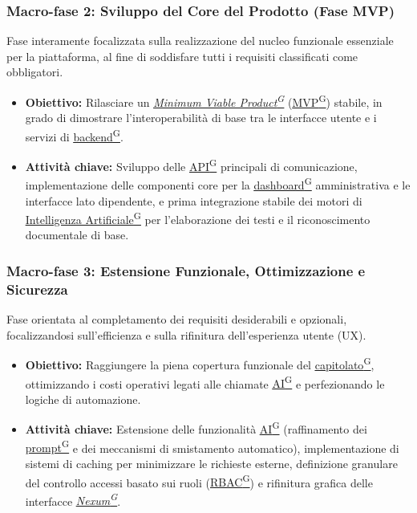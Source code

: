 \documentclass[a4paper,12pt]{article}
\providecommand{\glslink}[2]{\href{https://alittlebyte-19.github.io/Documentazione/glossario.html\#gls-#1}{\underline{#2}\textsuperscript{\scriptsize G}}}
\begin{document}
\subsubsection{Macro-fase 2: Sviluppo del Core del Prodotto (Fase MVP)}
Fase interamente focalizzata sulla realizzazione del nucleo funzionale essenziale per la piattaforma, al fine di soddisfare tutti i requisiti classificati come obbligatori.
\begin{itemize}
    \item \textbf{Obiettivo:} Rilasciare un \textit{\glslink{mvp-minimum-viable-product}{Minimum Viable Product}} (\glslink{mvp-minimum-viable-product}{MVP}) stabile, in grado di dimostrare l'interoperabilità di base tra le interfacce utente e i servizi di \glslink{backend}{backend}.
    \item \textbf{Attività chiave:} Sviluppo delle \glslink{api-application-programming-interface}{API} principali di comunicazione, implementazione delle componenti core per la \glslink{dashboard}{dashboard} amministrativa e le interfacce lato dipendente, e prima integrazione stabile dei motori di \glslink{intelligenza-artificiale-ai}{Intelligenza Artificiale} per l'elaborazione dei testi e il riconoscimento documentale di base.
\end{itemize}

\subsubsection{Macro-fase 3: Estensione Funzionale, Ottimizzazione e Sicurezza}
Fase orientata al completamento dei requisiti desiderabili e opzionali, focalizzandosi sull'efficienza e sulla rifinitura dell'esperienza utente (UX).
\begin{itemize}
    \item \textbf{Obiettivo:} Raggiungere la piena copertura funzionale del \glslink{capitolato}{capitolato}, ottimizzando i costi operativi legati alle chiamate \glslink{intelligenza-artificiale-ai}{AI} e perfezionando le logiche di automazione.
    \item \textbf{Attività chiave:} Estensione delle funzionalità \glslink{intelligenza-artificiale-ai}{AI} (raffinamento dei \glslink{prompt}{prompt} e dei meccanismi di smistamento automatico), implementazione di sistemi di caching per minimizzare le richieste esterne, definizione granulare del controllo accessi basato sui ruoli (\glslink{rbac-role-based-access-control}{RBAC}) e rifinitura grafica delle interfacce \textit{\glslink{nexum}{Nexum}}.
\end{itemize}
\end{document}
